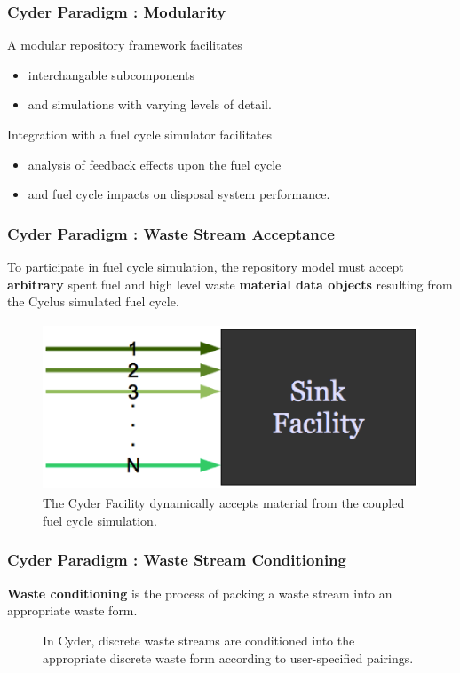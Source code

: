 
\begin{frame}[ctb!]
  \frametitle{Cyder Paradigm : Modularity }
  A modular repository framework facilitates 
  \begin{itemize}
    \item  interchangable subcomponents 
    \item and simulations with varying levels of detail.
  \end{itemize}
 \pause
  Integration with a fuel cycle simulator facilitates
  \begin{itemize}
    \item analysis of feedback effects upon the fuel cycle
    \item and fuel cycle impacts on disposal system performance.
  \end{itemize}
\end{frame}


\begin{frame}[ctb!]
  \frametitle{Cyder Paradigm : Waste Stream Acceptance}
To participate in fuel cycle simulation, the repository model must accept 
\textbf{arbitrary} spent fuel and high level waste \textbf{material data 
objects} resulting from the Cyclus simulated fuel cycle.  

  \begin{figure}[htbp!]
    \begin{center}
      \includegraphics[height=5cm]{./images/sinkfacility.eps}
    \end{center}
    \caption{ The Cyder Facility dynamically accepts material from the 
    coupled fuel cycle simulation.} 
    \label{fig:sinkfacility}
  \end{figure}
\end{frame}

\begin{frame}[ctb!]
  \frametitle{Cyder Paradigm : Waste Stream Conditioning}
  \footnotesize{

    \textbf{Waste conditioning} is the process of packing a waste stream into an appropriate 
waste form. 
  
\begin{figure}[htbp!]
\begin{center}
\def\svgwidth{.5\textwidth}

\end{center}
\caption{In Cyder, discrete waste streams are conditioned into the appropriate 
discrete waste form according to user-specified pairings.}
\label{fig:ws_conditioning}
\end{figure}
}
\end{frame}

